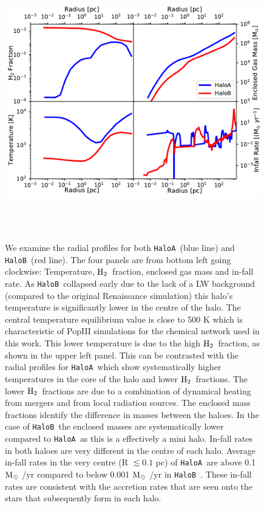 \documentclass[graphics, twocolumn, usenatbib]{mn2e}
\newcommand{\msolar} {$\rm{M_{\odot}}~$}
\newcommand{\molH} {$\rm{H_2}$~}
\newcommand{\ha} {\texttt{HaloA~}}
\newcommand{\hb} {\texttt{HaloB~}}
\begin{document}
\begin{figure}
\centering
\begin{minipage}{175mm}      \begin{center}
\centerline{
    \includegraphics[width=18.0cm, height=12cm]{FIGURES/MultiPlot.pdf}}
\caption{We examine the radial profiles for both \ha (blue line) and \hb (red line). The four panels
  are from bottom left going clockwise: Temperature, \molH fraction, enclosed gas mass and in-fall rate.
  As \hb collapsed early due to the lack of a LW background (compared to the original Renaissance simulation)
  this halo's temperature is significantly lower in the centre of the halo. The central temperature equilibrium
  value is close to 500 K which is characteristic of PopIII simulations for the chemical network used in this work.
  This lower temperature is due to the high \molH fraction, as shown in the upper left panel. This can
  be contrasted with the radial profiles for \ha which show systematically higher temperatures in the core of the
  halo and lower \molH fractions. The lower \molH fractions are due to a combination of dynamical heating from
  mergers and from local radiation sources. The enclosed mass fractions identify the difference
  in masses between the haloes. In the case of \hb the enclosed masses are systematically lower compared
  to \ha as this is a effectively a mini halo. In-fall rates in both haloes are very different in the
  centre of each halo. Average in-fall rates in the very centre (R $\lesssim 0.1$ pc) of \ha are
  above 0.1 \msolar/yr compared to below 0.001 \msolar/yr in \hb. These in-fall rates are consistent
  with the accretion rates that are seen onto the stars that subsequently form in each halo. }
\label{Fig:RadialProfiles}
\end{center} \end{minipage}
\end{figure}
\end{document}
